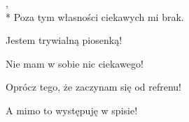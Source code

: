 
\begin{lyrics}
  \begin{chorus}%
    ,\\*
    Poza tym własności ciekawych mi brak.
  \end{chorus}

  Jestem trywialną piosenką!

  \chorusref

  Nie mam w sobie nic ciekawego!

  \chorusref

  Oprócz tego, że zaczynam się od refrenu!

  \chorusref

  A mimo to występuję w spisie!
\end{lyrics}
